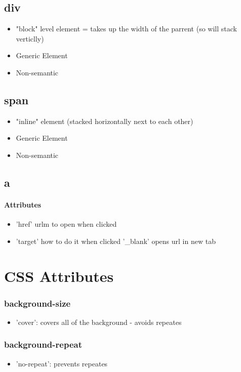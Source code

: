 \documentclass[]{article}
\begin{document}
\subsection{div}
\begin{itemize}
	\item "block" level element = takes up the width of the parrent (so will stack verticlly)
	\item Generic Element
	\item Non-semantic
\end{itemize}

\subsection{span}
\begin{itemize}
	\item "inline" element (stacked horizontally next to each other)
	\item Generic Element
	\item Non-semantic
\end{itemize}

\subsection{a}
\paragraph{Attributes}
\begin{itemize}
	\item 'href' urlm to open when clicked
	\item 'target' how to do it when clicked
	\subitem '\_blank' opens url in new tab 
\end{itemize}


\section{CSS Attributes}
\subsubsection{background-size}
\begin{itemize}
	\item 'cover': covers all of the background - avoids repeates
\end{itemize}
\subsubsection{background-repeat}
\begin{itemize}
	\item 'no-repeat': prevents repeates
\end{itemize}
\end{document}
